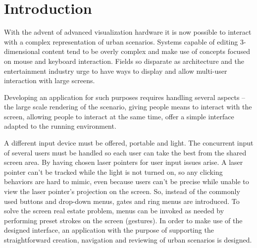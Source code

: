 \chapter{Introduction}






With the advent of advanced visualization hardware it is now possible
to interact with a complex representation of urban scenarios.
Systems capable of editing 3-dimensional content
tend to be overly complex and make use of concepts
focused on mouse and keyboard interaction.
Fields so disparate as architecture and the entertainment industry
urge to have ways to display and allow multi-user interaction with large screens.



Developing an application for such purposes requires handling several aspects
-- the large scale rendering of the scenario,
giving people means to interact with the screen,
allowing people to interact at the same time,
offer a simple interface adapted to the running environment.



A different input device must be offered, portable and light.
The concurrent input of several users must be handled so each user can
take the best from the shared screen area.
By having chosen laser pointers for user input issues arise.
A laser pointer can't be tracked while the light is not turned on,
so any clicking behaviors are hard to mimic, even because users can't be 
precise while unable to view the laser pointer's projection on the screen.
So, instead of the commonly used buttons and drop-down menus,
gates and ring menus are introduced.
To solve the screen real estate problem, menus can be invoked as needed
by performing preset strokes on the screen (gestures).
In order to make use of the designed interface, an application with the
purpose of supporting the straightforward creation, navigation and reviewing of urban scenarios is designed.


